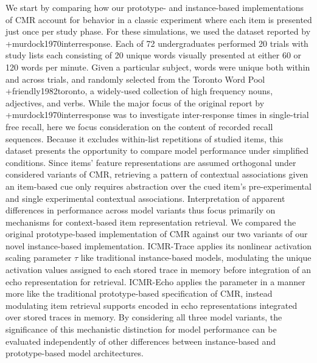 We start by comparing how our prototype- and instance-based implementations of CMR account for behavior in a classic experiment where each item is presented just once per study phase. For these simulations, we used the dataset reported by +{}{}{murdock1970interresponse}. Each of 72 undergraduates performed 20 trials with study lists each consisting of 20 unique words visually presented at either 60 or 120 words per minute. Given a particular subject, words were unique both within and across trials, and randomly selected from the Toronto Word Pool +{}{}{friendly1982toronto}, a widely-used collection of high frequency nouns, adjectives, and verbs.\markdownRendererInterblockSeparator
{}While the major focus of the original report by +{}{}{murdock1970interresponse} was to investigate inter-response times in single-trial free recall, here we focus consideration on the content of recorded recall sequences. Because it excludes within-list repetitions of studied items, this dataset presents the opportunity to compare model performance under simplified conditions. Since items' feature representations are assumed orthogonal under considered variants of CMR, retrieving a pattern of contextual associations given an item-based cue only requires abstraction over the cued item's pre-experimental and single experimental contextual associations. Interpretation of apparent differences in performance across model variants thus focus primarily on mechanisms for context-based item representation retrieval.\markdownRendererInterblockSeparator
{}We compared the original prototype-based implementation of CMR against our two variants of our novel instance-based implementation. ICMR-Trace applies its nonlinear activation scaling parameter $\tau$ like traditional instance-based models, modulating the unique activation values assigned to each stored trace in memory before integration of an echo representation for retrieval. ICMR-Echo applies the parameter in a manner more like the traditional prototype-based specification of CMR, instead modulating item retrieval supports encoded in echo representations integrated over stored traces in memory. By considering all three model variants, the significance of this mechanistic distinction for model performance can be evaluated independently of other differences between instance-based and prototype-based model architectures.\markdownRendererInterblockSeparator
